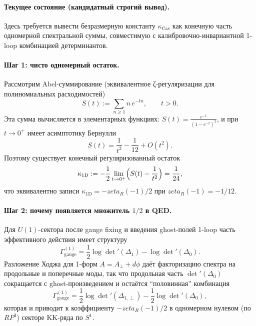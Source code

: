 \documentclass[12pt]{article}
\def\mathbb#1{#1}%
\def\zeta{zeta}%
\begin{document}
\paragraph{Текущее состояние (кандидатный строгий вывод).}
Здесь требуется вывести безразмерную константу $\kappa_{\mathrm{Cas}}$ как конечную часть одномерной спектральной суммы, совместимую с калибровочно-инвариантной 1-loop комбинацией детерминантов.

\paragraph{Шаг 1: чисто одномерный остаток.}
Рассмотрим Abel-суммирование (эквивалентное ζ-регуляризации для полиномиальных расходимостей)
\begin{equation}
S(t):=\sum_{n\ge 1} n\,e^{-tn},\qquad t>0.
\end{equation}
Эта сумма вычисляется в элементарных функциях:
$S(t)=\frac{e^{-t}}{(1-e^{-t})^2}$, и при $t\to 0^+$ имеет асимптотику Бернулли
\begin{equation}
S(t)=\frac{1}{t^2}-\frac{1}{12}+O(t^2).
\end{equation}
Поэтому существует конечный регуляризованный остаток
\begin{equation}
\kappa_{\mathrm{1D}}:=-\frac12\lim_{t\to 0^+}\Bigl(S(t)-\frac{1}{t^2}\Bigr)=\frac{1}{24},
\end{equation}
что эквивалентно записи $\kappa_{\mathrm{1D}}=-\zeta_R(-1)/2$ при $\zeta_R(-1)=-1/12$.

\paragraph{Шаг 2: почему появляется множитель $1/2$ в QED.}
Для $U(1)$-сектора после gauge fixing и введения ghost-полей 1-loop часть эффективного действия имеет структуру
\begin{equation}
\Gamma^{(1)}_{\mathrm{gauge}}=\frac12\log\det'(\Delta_1)-\log\det'(\Delta_0).
\end{equation}
Разложение Ходжа для 1-форм $A=A_{\perp}+d\phi$ даёт факторизацию спектра на продольные и поперечные моды, так что продольная часть $\det'(\Delta_0)$ сокращается с ghost-произведением и остаётся ``половинная'' комбинация
\begin{equation}
\Gamma^{(1)}_{\mathrm{gauge}}=\frac12\log\det'(\Delta_{1,\perp})-\frac12\log\det'(\Delta_0),
\end{equation}
которая и приводит к коэффициенту $-\zeta_R(-1)/2$ в одномерном нулевом (по $\mathbb{RP}^3$) секторе KK-ряда по $S^1$.
\end{document}
